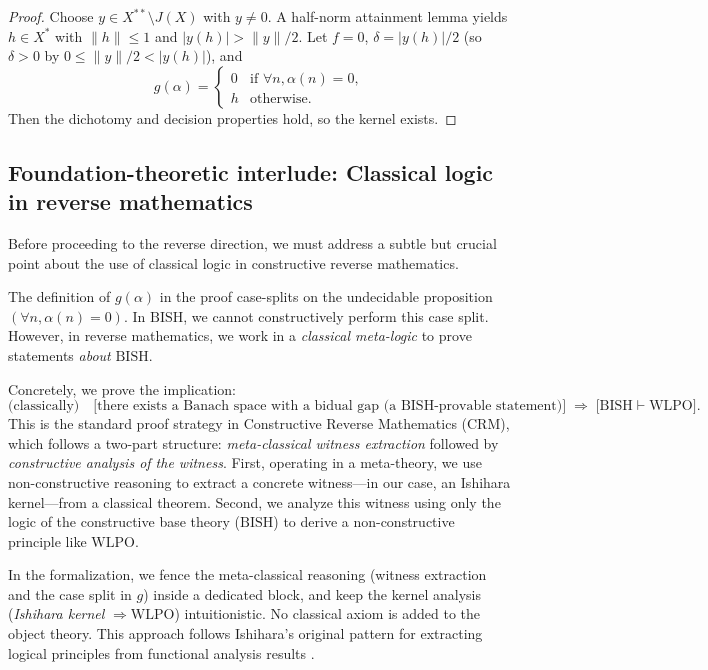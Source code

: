 \documentclass[11pt]{article}
\newcommand{\WLPO}{\mathrm{WLPO}}
\newcommand{\BISH}{\mathrm{BISH}}
\begin{document}
\begin{proof}
Choose $y\in X^{**}\setminus J(X)$ with $y\ne 0$. A half-norm attainment lemma yields $h\in X^*$ with $\|h\|\le 1$ and $|y(h)|>\|y\|/2$. Let $f=0$, $\delta=|y(h)|/2$ (so $\delta>0$ by $0 \leq \|y\|/2 < |y(h)|$), and
\[
g(\alpha)=\begin{cases}
0 & \text{if } \forall n,\alpha(n)=0,\\
h & \text{otherwise}.
\end{cases}
\]
Then the dichotomy and decision properties hold, so the kernel exists.
\end{proof}

\subsection{Foundation-theoretic interlude: Classical logic in reverse mathematics}

Before proceeding to the reverse direction, we must address a subtle but crucial point about the use of classical logic in constructive reverse mathematics.

\begin{rem}\label{rem:meta-classical}
The definition of $g(\alpha)$ in the proof case-splits on the undecidable proposition
$(\forall n,\alpha(n)=0)$. In $\BISH$, we cannot constructively perform this case split.
However, in reverse mathematics, we work in a \emph{classical meta-logic} to prove
statements \emph{about} $\BISH$.

Concretely, we prove the implication:
\[
  \text{(classically)}\quad
  \big[\text{there exists a Banach space with a bidual gap (a $\BISH$-provable statement)}\big]
  \;\Longrightarrow\;
  \big[\BISH \vdash \WLPO\big].
\]
This is the standard proof strategy in Constructive Reverse Mathematics (CRM), which follows a two-part structure: \emph{meta-classical witness extraction} followed by \emph{constructive analysis of the witness}. First, operating in a meta-theory, we use non-constructive reasoning to extract a concrete witness---in our case, an Ishihara kernel---from a classical theorem. Second, we analyze this witness using only the logic of the constructive base theory ($\BISH$) to derive a non-constructive principle like $\WLPO$.

In the formalization, we fence the meta-classical reasoning (witness extraction and
the case split in $g$) inside a dedicated block, and keep the kernel analysis
(\emph{Ishihara kernel} $\Rightarrow \WLPO$) intuitionistic. No classical axiom
is added to the object theory. This approach follows Ishihara's original pattern for extracting logical principles from functional analysis results \cite{Ishihara90}.
\end{rem}
\end{document}
